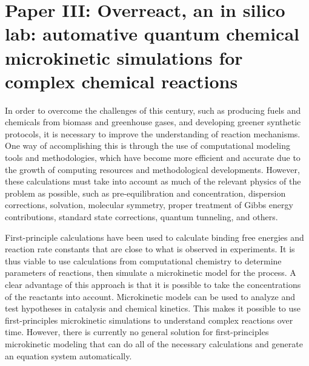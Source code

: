 \chapter{Paper III:\@
  Overreact,
  an in silico lab:
  \linebreak
  automative quantum chemical microkinetic simulations
  for complex chemical reactions
 }%
\label{ch:paper3}

\begin{citacao}
\end{citacao}

In order to overcome the challenges of this century,
such as producing fuels and chemicals from biomass and greenhouse gases,
and developing greener synthetic protocols,
it is necessary to improve the understanding of reaction mechanisms.
One way of accomplishing this is through the use of computational modeling tools and methodologies,
which have become more efficient and accurate due to the growth of computing resources and methodological developments.
However,
these calculations must take into account as much of the relevant physics of the problem as possible,
such as pre-equilibration and concentration,
dispersion corrections,
solvation,
molecular symmetry,
proper treatment of Gibbs energy contributions,
standard state corrections,
quantum tunneling,
and others.

First-principle calculations have been used to calculate binding free energies
and reaction rate constants that are close to what is observed in experiments.
It is thus viable to use calculations from computational chemistry to determine parameters of reactions,
then simulate a microkinetic model for the process.
A clear advantage of this approach is that it is possible to take the concentrations of the reactants into account.
Microkinetic models can be used to analyze and test hypotheses in catalysis and chemical kinetics.
This makes it possible to use first-principles microkinetic simulations to understand complex reactions over time.
However,
there is currently no general solution for first-principles microkinetic modeling
that can do all of the necessary calculations and generate an equation system automatically.


